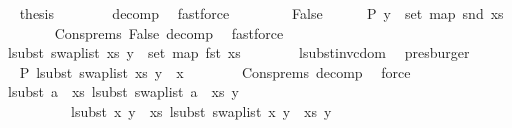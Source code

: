 \begin{isabellebody}
\ \isamarkupfalse%
\ {\isacharquery}{\kern0pt}thesis\isanewline
\ \ \ \ \ \ \isamarkupfalse%
\ decomp\ \isamarkupfalse%
\ fastforce\isanewline
\ \ \isamarkupfalse%
\isanewline
\ \ \ \ \isamarkupfalse%
\ False\isanewline
\ \ \ \ \isamarkupfalse%
\ P{}{\isacharcolon}{\kern0pt}\ {\isachardoublequoteopen}y\ {\isasymin}\ set\ {\isacharparenleft}{\kern0pt}map\ snd\ xs{\isacharparenright}{\kern0pt}{\isachardoublequoteclose}\isanewline
\ \ \ \ \ \ \isamarkupfalse%
\ Cons{\isachardot}{\kern0pt}prems{\isacharparenleft}{\kern0pt}{}{\isacharparenright}{\kern0pt}\ False\ decomp\ \isamarkupfalse%
\ fastforce\isanewline
\ \ \ \ \isamarkupfalse%
\ \isamarkupfalse%
\ {\isachardoublequoteopen}lsubst\ {\isacharparenleft}{\kern0pt}swap{\isacharunderscore}{\kern0pt}list\ xs{\isacharparenright}{\kern0pt}\ y\ {\isasymin}\ set\ {\isacharparenleft}{\kern0pt}map\ fst\ xs{\isacharparenright}{\kern0pt}{\isachardoublequoteclose}\isanewline
\ \ \ \ \ \ \isamarkupfalse%
\ lsubst{\isacharunderscore}{\kern0pt}inv{\isacharunderscore}{\kern0pt}cdom\ \isamarkupfalse%
\ presburger\isanewline
\ \ \ \ \isamarkupfalse%
\ \isamarkupfalse%
\ P{}{\isacharcolon}{\kern0pt}\ {\isachardoublequoteopen}lsubst\ {\isacharparenleft}{\kern0pt}swap{\isacharunderscore}{\kern0pt}list\ xs{\isacharparenright}{\kern0pt}\ y\ {\isasymnoteq}\ x{\isachardoublequoteclose}\isanewline
\ \ \ \ \ \ \isamarkupfalse%
\ Cons{\isachardot}{\kern0pt}prems{\isacharparenleft}{\kern0pt}{}{\isacharparenright}{\kern0pt}\ decomp\ \isamarkupfalse%
\ force\isanewline
\isanewline
\ \ \ \ \isamarkupfalse%
\ {\isachardoublequoteopen}lsubst\ {\isacharparenleft}{\kern0pt}a\ {\isacharhash}{\kern0pt}\ xs{\isacharparenright}{\kern0pt}\ {\isacharparenleft}{\kern0pt}lsubst\ {\isacharparenleft}{\kern0pt}swap{\isacharunderscore}{\kern0pt}list\ {\isacharparenleft}{\kern0pt}a\ {\isacharhash}{\kern0pt}\ xs{\isacharparenright}{\kern0pt}{\isacharparenright}{\kern0pt}\ y{\isacharparenright}{\kern0pt}\ {\isacharequal}{\kern0pt}\isanewline
\ \ \ \ \ \ \ \ \ \ lsubst\ {\isacharparenleft}{\kern0pt}{\isacharparenleft}{\kern0pt}x{\isacharcomma}{\kern0pt}\ y{\isacharprime}{\kern0pt}{\isacharparenright}{\kern0pt}\ {\isacharhash}{\kern0pt}\ xs{\isacharparenright}{\kern0pt}\ {\isacharparenleft}{\kern0pt}lsubst\ {\isacharparenleft}{\kern0pt}swap{\isacharunderscore}{\kern0pt}list\ {\isacharparenleft}{\kern0pt}{\isacharparenleft}{\kern0pt}x{\isacharcomma}{\kern0pt}\ y{\isacharprime}{\kern0pt}{\isacharparenright}{\kern0pt}\ {\isacharhash}{\kern0pt}\ xs{\isacharparenright}{\kern0pt}{\isacharparenright}{\kern0pt}\ y{\isacharparenright}{\kern0pt}{\isachardoublequoteclose}\isanewline

\end{isabellebody}
